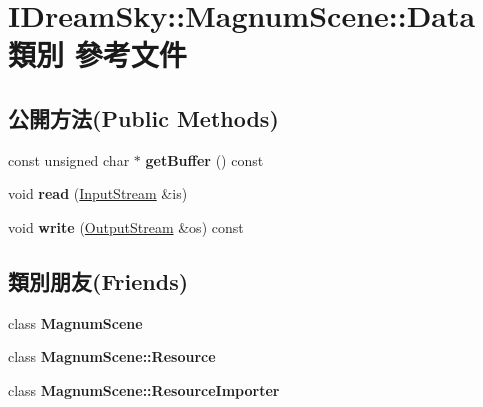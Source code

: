 \hypertarget{class_i_dream_sky_1_1_magnum_scene_1_1_data}{}\section{I\+Dream\+Sky\+:\+:Magnum\+Scene\+:\+:Data 類別 參考文件}
\label{class_i_dream_sky_1_1_magnum_scene_1_1_data}
\subsection*{公開方法(Public Methods)}
\begin{DoxyCompactItemize}
\item 
const unsigned char $\ast$ {\bfseries get\+Buffer} () const \hypertarget{class_i_dream_sky_1_1_magnum_scene_1_1_data_a872f8b2f1b36668568883a6c6412cf24}{}\label{class_i_dream_sky_1_1_magnum_scene_1_1_data_a872f8b2f1b36668568883a6c6412cf24}

\item 
void {\bfseries read} (\hyperlink{class_i_dream_sky_1_1_input_stream}{Input\+Stream} \&is)\hypertarget{class_i_dream_sky_1_1_magnum_scene_1_1_data_aedfb49c8f6174996ef0bff0091873c0a}{}\label{class_i_dream_sky_1_1_magnum_scene_1_1_data_aedfb49c8f6174996ef0bff0091873c0a}

\item 
void {\bfseries write} (\hyperlink{class_i_dream_sky_1_1_output_stream}{Output\+Stream} \&os) const \hypertarget{class_i_dream_sky_1_1_magnum_scene_1_1_data_aad244dc2917e0decc9b999f5ace6528a}{}\label{class_i_dream_sky_1_1_magnum_scene_1_1_data_aad244dc2917e0decc9b999f5ace6528a}

\end{DoxyCompactItemize}
\subsection*{類別朋友(Friends)}
\begin{DoxyCompactItemize}
\item 
class {\bfseries Magnum\+Scene}\hypertarget{class_i_dream_sky_1_1_magnum_scene_1_1_data_a0f518a37dee4252bc83e1953ecf3e240}{}\label{class_i_dream_sky_1_1_magnum_scene_1_1_data_a0f518a37dee4252bc83e1953ecf3e240}

\item 
class {\bfseries Magnum\+Scene\+::\+Resource}\hypertarget{class_i_dream_sky_1_1_magnum_scene_1_1_data_ad6ab972c70e10994a4dc5940fd732571}{}\label{class_i_dream_sky_1_1_magnum_scene_1_1_data_ad6ab972c70e10994a4dc5940fd732571}

\item 
class {\bfseries Magnum\+Scene\+::\+Resource\+Importer}\hypertarget{class_i_dream_sky_1_1_magnum_scene_1_1_data_a2a9515b539dbf6a1c27e41cbdc8d4ced}{}\label{class_i_dream_sky_1_1_magnum_scene_1_1_data_a2a9515b539dbf6a1c27e41cbdc8d4ced}

\end{DoxyCompactItemize}



